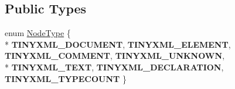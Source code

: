 \subsection*{Public Types}
\begin{DoxyCompactItemize}
\item 
enum \hyperlink{classTiXmlNode_a836eded4920ab9e9ef28496f48cd95a2}{Node\+Type} \{ \\*
{\bfseries T\+I\+N\+Y\+X\+M\+L\+\_\+\+D\+O\+C\+U\+M\+E\+NT}, 
{\bfseries T\+I\+N\+Y\+X\+M\+L\+\_\+\+E\+L\+E\+M\+E\+NT}, 
{\bfseries T\+I\+N\+Y\+X\+M\+L\+\_\+\+C\+O\+M\+M\+E\+NT}, 
{\bfseries T\+I\+N\+Y\+X\+M\+L\+\_\+\+U\+N\+K\+N\+O\+WN}, 
\\*
{\bfseries T\+I\+N\+Y\+X\+M\+L\+\_\+\+T\+E\+XT}, 
{\bfseries T\+I\+N\+Y\+X\+M\+L\+\_\+\+D\+E\+C\+L\+A\+R\+A\+T\+I\+ON}, 
{\bfseries T\+I\+N\+Y\+X\+M\+L\+\_\+\+T\+Y\+P\+E\+C\+O\+U\+NT}
 \}
\end{DoxyCompactItemize}
